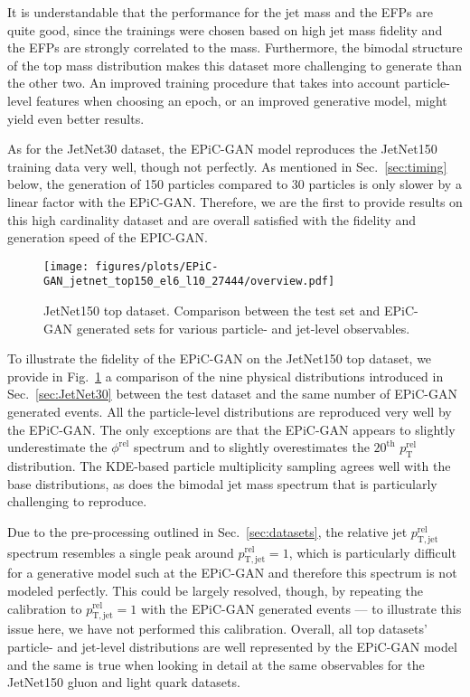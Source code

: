 \documentclass[a4paper,submission, Phys]{SciPost}
\DeclareRobustCommand{\Sec}[1]{Sec.~\ref{sec:#1}}
\DeclareRobustCommand{\Fig}[1]{Fig.~\ref{fig:#1}}
\begin{document}
It is understandable that the performance for the jet mass and the EFPs are quite good, since the trainings were chosen based on high jet mass fidelity and the EFPs are strongly correlated to the mass. 
%
Furthermore, the bimodal structure of the top mass distribution makes this dataset more challenging to generate than the other two. 
%
An improved training procedure that takes into account particle-level features when choosing an epoch, or an improved generative model, might yield even better results.


As for the JetNet30 dataset, the EPiC-GAN model reproduces the JetNet150 training data very well, though not perfectly.
%
As mentioned in \Sec{timing} below, the generation of 150 particles compared to 30 particles is only slower by a linear factor with the EPiC-GAN. 
%
Therefore, we are the first to provide results on this high cardinality dataset and are overall satisfied with the fidelity and generation speed of the EPIC-GAN. 


\begin{figure}[tbp]
\centering
\texttt{[image: figures/plots/EPiC-GAN\_jetnet\_top150\_el6\_l10\_27444/overview.pdf]}
\caption{JetNet150 top dataset. Comparison between the test set and EPiC-GAN generated sets for various particle- and jet-level observables.}
\label{fig:JetNet150_top}
\end{figure}


To illustrate the fidelity of the EPiC-GAN on the JetNet150 top dataset, we provide in \Fig{JetNet150_top} a comparison of the nine physical distributions introduced in \Sec{JetNet30} between the test dataset and the same number of EPiC-GAN generated events. 
%
All the particle-level distributions are reproduced very well by the EPiC-GAN.  
%
The only exceptions are that the EPiC-GAN appears to slightly underestimate the $\phi^\mathrm{rel}$ spectrum and to slightly overestimates the $20^\mathrm{th}$ $p_\mathrm{T}^\mathrm{rel}$ distribution.
%
The KDE-based particle multiplicity sampling agrees well with the base distributions, as does the bimodal jet mass spectrum that is particularly challenging to reproduce. 


Due to the pre-processing outlined in \Sec{datasets}, the relative jet $p_\mathrm{T,jet}^\mathrm{rel}$ spectrum resembles a single peak around $p_\mathrm{T,jet}^\mathrm{rel}=1$, which is particularly difficult for a generative model such at the EPiC-GAN and therefore this spectrum is not modeled perfectly. 
%
This could be largely resolved, though, by repeating the calibration to $p_\mathrm{T,jet}^\mathrm{rel}=1$ with the EPiC-GAN generated events --- to illustrate this issue here, we have not performed this calibration. 
%
Overall, all top datasets' particle- and jet-level distributions are well represented by the EPiC-GAN model and the same is true when looking in detail at the same observables for the JetNet150 gluon and light quark datasets. 
\end{document}
